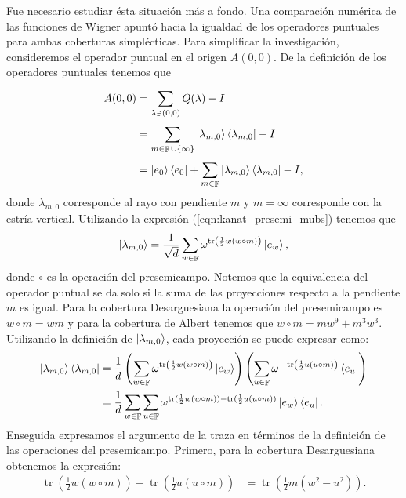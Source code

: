 \documentclass[a4paper]{report}
\DeclareMathOperator{\F}{\mathbb{F}}
\DeclareMathOperator{\tr}{tr}
\begin{document}
  Fue necesario estudiar ésta situación más a fondo. Una
  comparación numérica de las funciones de Wigner apuntó
  hacia la igualdad de los operadores puntuales para ambas
  coberturas simplécticas. Para simplificar la
  investigación, consideremos el operador puntual en el
  origen $A(0,0)$. De la definición de los operadores
  puntuales tenemos que
  \begin{align}
    A(0,0)
    &= \sum_{\lambda \ni (0,0)}^{} Q(\lambda) - I \\
    &= \sum_{m \in \F \cup \{\infty\}}^{} \ket{\lambda_{m,0}}
    \bra{\lambda_{m,0}} - I \\
    &= \ket{e_0}\bra{e_0}
    + \sum_{m \in \F}^{}
    \ket{\lambda_{m,0}}\bra{\lambda_{m,0}} - I,
  \end{align}
  donde $\lambda_{m,0}$ corresponde al rayo con pendiente
  $m$ y $m = \infty$ corresponde con la estría vertical.
  Utilizando la expresión (\ref{eqn:kanat_presemi_mubs})
  tenemos que
  \begin{equation}
    \ket{\lambda_{m,0}}
    = \frac{1}{\sqrt{d}} \sum_{w \in \F}^{}
    \omega^{\tr\left( \frac{1}{2} w(w\circ m) \right) }
    \ket{e_w},
  \end{equation}
  donde $\circ$ es la operación del presemicampo. Notemos
  que la equivalencia del operador puntual se da solo si la
  suma de las proyecciones respecto a la pendiente $m$ es
  igual. Para la cobertura Desarguesiana la operación del
  presemicampo es $w \circ m = wm$ y para la cobertura de
  Albert tenemos que $w \circ m = mw^{9} + m^3 w^3$.
  Utilizando la definición de $\ket{\lambda_{m,0}}$, cada
  proyección se puede expresar como:
  \begin{align}
    \ket{\lambda_{m,0}} \bra{\lambda_{m,0}}
    &= \frac{1}{d} 
    \left(
      \sum_{w \in \F}^{} \omega^{\tr\left( \frac{1}{2}
      w(w\circ m) \right) }
      \ket{e_w}
    \right) 
    \left(
      \sum_{u \in \F}^{} \omega^{-\tr\left( \frac{1}{2}
      u(u\circ m) \right) }
      \bra{e_u}
    \right) \\
    &= \frac{1}{d}
    \sum_{w \in \F}^{} \sum_{u \in \F}^{} 
    \omega^{\tr( \frac{1}{2} w(w\circ m)) - \tr( \frac{1}{2}
    u(u\circ m))} 
    \ket{e_w} \bra{e_u}.
  \end{align}
  Enseguida expresamos el argumento de la traza en términos
  de la definición de las operaciones del presemicampo.
  Primero, para la cobertura Desarguesiana obtenemos la
  expresión:
  \begin{align}
    \tr\left(\frac{1}{2} w(w\circ m)\right)
    - \tr\left(\frac{1}{2} u(u\circ m)\right)
    &= \tr\left(\frac{1}{2} m \left( w^2-u^2 \right)\right).
  \end{align}
\end{document}
